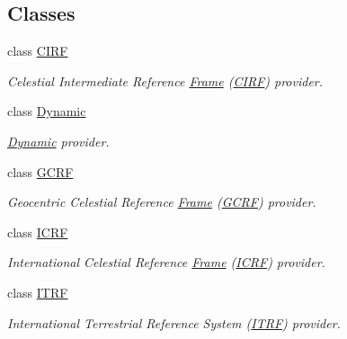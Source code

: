 \subsection*{Classes}
\begin{DoxyCompactItemize}
\item 
class \hyperlink{classlibrary_1_1physics_1_1coord_1_1frame_1_1provider_1_1_c_i_r_f}{C\+I\+RF}
\begin{DoxyCompactList}\small\item\em Celestial Intermediate Reference \hyperlink{classlibrary_1_1physics_1_1coord_1_1_frame}{Frame} (\hyperlink{classlibrary_1_1physics_1_1coord_1_1frame_1_1provider_1_1_c_i_r_f}{C\+I\+RF}) provider. \end{DoxyCompactList}\item 
class \hyperlink{classlibrary_1_1physics_1_1coord_1_1frame_1_1provider_1_1_dynamic}{Dynamic}
\begin{DoxyCompactList}\small\item\em \hyperlink{classlibrary_1_1physics_1_1coord_1_1frame_1_1provider_1_1_dynamic}{Dynamic} provider. \end{DoxyCompactList}\item 
class \hyperlink{classlibrary_1_1physics_1_1coord_1_1frame_1_1provider_1_1_g_c_r_f}{G\+C\+RF}
\begin{DoxyCompactList}\small\item\em Geocentric Celestial Reference \hyperlink{classlibrary_1_1physics_1_1coord_1_1_frame}{Frame} (\hyperlink{classlibrary_1_1physics_1_1coord_1_1frame_1_1provider_1_1_g_c_r_f}{G\+C\+RF}) provider. \end{DoxyCompactList}\item 
class \hyperlink{classlibrary_1_1physics_1_1coord_1_1frame_1_1provider_1_1_i_c_r_f}{I\+C\+RF}
\begin{DoxyCompactList}\small\item\em International Celestial Reference \hyperlink{classlibrary_1_1physics_1_1coord_1_1_frame}{Frame} (\hyperlink{classlibrary_1_1physics_1_1coord_1_1frame_1_1provider_1_1_i_c_r_f}{I\+C\+RF}) provider. \end{DoxyCompactList}\item 
class \hyperlink{classlibrary_1_1physics_1_1coord_1_1frame_1_1provider_1_1_i_t_r_f}{I\+T\+RF}
\begin{DoxyCompactList}\small\item\em International Terrestrial Reference System (\hyperlink{classlibrary_1_1physics_1_1coord_1_1frame_1_1provider_1_1_i_t_r_f}{I\+T\+RF}) provider. \end{DoxyCompactList}\item 

\end{DoxyCompactItemize}
